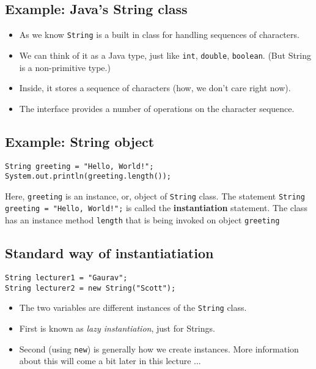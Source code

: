 \subsection{Example: Java's String class}

  \begin{itemize}
  \item As we know \lstinline!String! is a built in class for handling sequences
    of characters.
  \item We can think of it as a Java type, just like \lstinline!int!,
    \lstinline!double!, \lstinline!boolean!. (But String is a non-primitive
type.)
  \item Inside, it stores a sequence of characters (how, we don't
    care right now).
  \item The interface provides a number of operations on the character
    sequence.
  \end{itemize}

\subsection{Example: String object}

\begin{lstlisting}
String greeting = "Hello, World!";
System.out.println(greeting.length());
\end{lstlisting}
Here, \texttt{greeting} is an instance, or, object of \texttt{String} class. The statement \texttt{String greeting = "Hello, World!";} is called the \textbf{instantiation} statement. The class has an instance method \texttt{length} that is being invoked on object \texttt{greeting}

\subsection{Standard way of instantiatiation}

\begin{lstlisting}
String lecturer1 = "Gaurav";
String lecturer2 = new String("Scott");
\end{lstlisting}
  \begin{itemize}
  \item The two variables are different instances of the
    \lstinline!String! class.
  \item First is known as \emph{lazy instantiation}, just for Strings.
  \item Second (using \lstinline!new!) is generally how we create instances.
        More information about this will come a bit later in this lecture ...
  \end{itemize}

